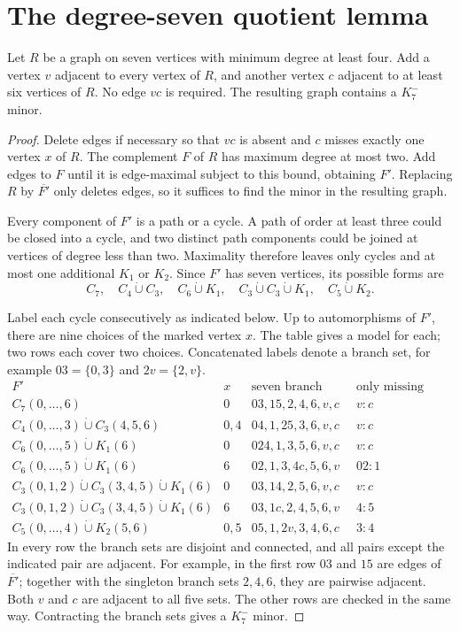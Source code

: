 \section{The degree-seven quotient lemma}\label{sec:finite}

\begin{lemma}\label{lem:quotient}
Let $R$ be a graph on seven vertices with minimum degree at least four.
Add a vertex $v$ adjacent to every vertex of $R$, and another vertex
$c$ adjacent to at least six vertices of $R$. No edge $vc$ is required.
The resulting graph contains a $K_7^{-}$ minor.
\end{lemma}

\begin{proof}
Delete edges if necessary so that $vc$ is absent and $c$ misses exactly
one vertex $x$ of $R$. The complement $F$ of $R$ has maximum degree at
most two. Add edges to $F$ until it is edge-maximal subject to this bound,
obtaining $F'$. Replacing $R$ by $\overline{F'}$ only deletes edges, so
it suffices to find the minor in the resulting graph.

Every component of $F'$ is a path or a cycle. A path of order at least
three could be closed into a cycle, and two distinct path components
could be joined at vertices of degree less than two. Maximality therefore
leaves only cycles and at most one additional $K_1$ or $K_2$. Since $F'$
has seven vertices, its possible forms are
\[
C_7,\quad C_4\dot\cup C_3,\quad C_6\dot\cup K_1,\quad
C_3\dot\cup C_3\dot\cup K_1,\quad C_5\dot\cup K_2.
\]

Label each cycle consecutively as indicated below. Up to automorphisms
of $F'$, there are nine choices of the marked vertex $x$. The table
gives a model for each; two rows each cover two choices. Concatenated
labels denote a branch set, for example $03=\{0,3\}$ and
$2v=\{2,v\}$.
\[
\begin{array}{c|c|c|c}
F'&x&\text{seven branch sets}&\text{only missing pair}\\
\hline
C_7(0,\ldots,6)&0&03,15,2,4,6,v,c&v:c\\
C_4(0,\ldots,3)\dot\cup C_3(4,5,6)&0,4
 &04,1,25,3,6,v,c&v:c\\
C_6(0,\ldots,5)\dot\cup K_1(6)&0
 &024,1,3,5,6,v,c&v:c\\
C_6(0,\ldots,5)\dot\cup K_1(6)&6
 &02,1,3,4c,5,6,v&02:1\\
C_3(0,1,2)\dot\cup C_3(3,4,5)\dot\cup K_1(6)&0
 &03,14,2,5,6,v,c&v:c\\
C_3(0,1,2)\dot\cup C_3(3,4,5)\dot\cup K_1(6)&6
 &03,1c,2,4,5,6,v&4:5\\
C_5(0,\ldots,4)\dot\cup K_2(5,6)&0,5
 &05,1,2v,3,4,6,c&3:4
\end{array}
\]
In every row the branch sets are disjoint and connected, and all pairs except
the indicated pair are adjacent. For example, in the first row $03$
and $15$ are edges of $\overline{F'}$; together with the singleton branch sets
$2,4,6$, they are pairwise adjacent. Both $v$ and $c$ are adjacent to
all five sets. The other rows are checked in the same way.
Contracting the branch sets gives a $K_7^{-}$ minor.
\end{proof}
